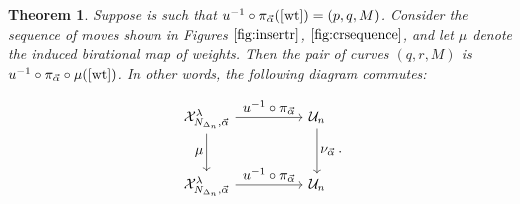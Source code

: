 \documentclass[pdftex]{sigma}
\numberwithin{equation}{section}
\newtheorem{Theorem}{Theorem}[section]
\newcommand{\wt}{{\rm wt}}
\begin{document}
	\begin{Theorem}
		\label{thm:crdynamicslocalmoves}
		Suppose \smash{$[\wt] \in \mathcal X_{N_{\Delta_n},\vec \alpha}^\lambda$} is such that $u^{-1} \circ \pi_{\vec \alpha} ([\wt])=(p,q,M)$. Consider the sequence of moves shown in Figures $\ref{fig:insertr}$, $\ref{fig:crsequence}$, and let $\mu$ denote the induced birational map of weights. Then the pair of curves $(q,r,M)$ is $u^{-1} \circ \pi_{\vec \alpha} \circ \mu ([\wt])$.	In other words, the following diagram commutes:
		
		\[
		{\begin{tikzcd}[every label/.append style = {font = \normalsize}, row sep=large, column sep = huge]
				\mathcal X_{N_{\Delta_n},\vec \alpha}^\lambda \arrow[r, "u^{-1} \circ \pi_{\vec \alpha}"] \arrow[d, "\mu"']
				& \mathcal U_n \arrow[d, "\nu_{\vec \alpha}"] \\
				\mathcal X_{N_{\Delta_n},\vec \alpha}^\lambda \arrow[r,"u^{-1} \circ \pi_{\vec \alpha}"]
				& \mathcal U_n
		\end{tikzcd}}.
		\]
\end{Theorem}
	
\end{document}
